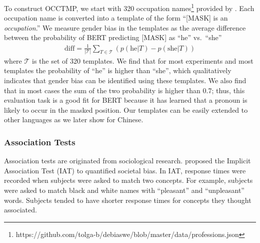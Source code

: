 To construct OCCTMP,
we start with 
320 occupation
names\footnote{https://github.com/tolga-b/debiaswe/blob/master/data/professions.json}
provided by \cite{bolukbasi2016man}.
Each occupation name is converted into a template of the form
``[MASK] is an \textit{occupation}.''
We measure
gender bias
in the templates as the average difference
between the probability of BERT predicting [MASK] as ``he''
vs.\ ``she''
\begin{eqnarray}
\text{diff}=\frac{1}{|{\mathcal T}|} \sum_{T \in
	{\mathcal T}}(p(\mbox{he}| T) - p(\mbox{she}|T))\nonumber
\end{eqnarray}
where $\mathcal T$ is the set of 320 templates.  We find
that for most experiments and most templates the probability
of ``he'' is higher than ``she'', which qualitatively
indicates that gender bias can be identified using these templates. We
also find that in most cases the sum of the two probability
is higher than 0.7; thus, this evaluation task is a good fit
for BERT because it has learned that a pronoun is likely to
occur in the masked position.
Our templates  can be easily extended to other
languages
as we later show for
Chinese.
\subsubsection{Association Tests}\label{sec:weat}
Association tests are originated from sociological research. \cite{greenwald1998measuring} proposed the Implicit Association Test (IAT) to quantified societal bias. In IAT, response times were recorded when subjects were asked to match two concepts. For example, subjects were asked to match black and white names with “pleasant” and “unpleasant” words. Subjects tended to have shorter response times for concepts they thought associated. 

